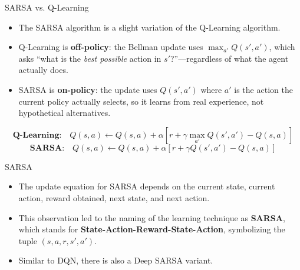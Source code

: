 \begin{frame}{SARSA vs. Q-Learning}
    \begin{itemize}
        \item The SARSA algorithm is a slight variation of the Q-Learning algorithm.
        \item Q-Learning is \textbf{off-policy}: the Bellman update uses $\max_{a'} Q(s',a')$, which asks ``what is the \emph{best possible} action in $s'$?''---regardless of what the agent actually does.
        \item SARSA is \textbf{on-policy}: the update uses $Q(s',a')$ where $a'$ is the action the current policy actually selects, so it learns from real experience, not hypothetical alternatives.
    \end{itemize}
    \pause
    \begin{equation*}
        \textbf{Q-Learning:}\quad Q(s,a) \leftarrow Q(s,a) + \alpha \left[ r + \gamma \max_{a'} Q(s',a') - Q(s,a) \right]
    \end{equation*}
    \pause
    \begin{equation*}
        \textbf{SARSA:}\quad Q(s,a) \leftarrow Q(s,a) + \alpha \left[ r + \gamma Q(s',a') - Q(s,a) \right]
    \end{equation*}
\end{frame}

\begin{frame}{SARSA}
    \begin{itemize}
        \item The update equation for SARSA depends on the current state, current action, reward obtained, next state, and next action.
        \item This observation led to the naming of the learning technique as \textbf{SARSA}, which stands for \textbf{State-Action-Reward-State-Action}, symbolizing the tuple $(s, a, r, s', a')$.
        \pause
        \item Similar to DQN, there is also a Deep SARSA variant.
    \end{itemize}
\end{frame}

